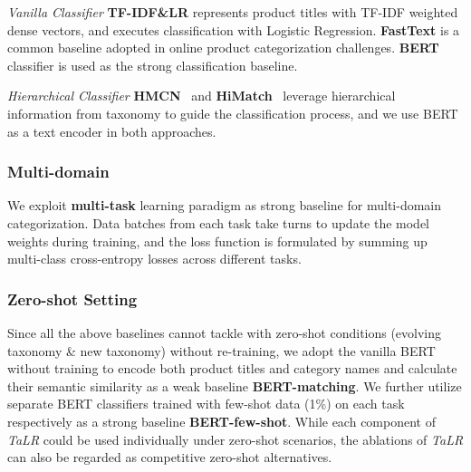 \textit{Vanilla Classifier} \textbf{TF-IDF\&LR} represents product titles with TF-IDF weighted dense vectors, and executes classification with Logistic Regression. \textbf{FastText} \cite{bojanowski2017enriching} is a common baseline adopted in online product categorization challenges. 
\textbf{BERT} classifier is used as the strong classification baseline.

\textit{Hierarchical Classifier} \textbf{HMCN}~\cite{wehrmann2018hierarchical} and \textbf{HiMatch}~\cite{chen2021hierarchy} leverage hierarchical information from taxonomy to 
guide the classification process, and we use BERT as a text encoder in both approaches. 

\subsubsection{Multi-domain}
We exploit \textbf{multi-task} learning paradigm as strong baseline for multi-domain categorization. 
Data batches from each task take turns to update the model weights during training, and the loss function is formulated by summing up multi-class cross-entropy losses across different tasks.
\subsubsection{Zero-shot Setting}
Since all the above baselines cannot tackle with zero-shot conditions (evolving taxonomy  \& new taxonomy) without re-training, we adopt the vanilla BERT without training to encode both product titles and category names and calculate their semantic similarity as a weak baseline \textbf{BERT-matching}. We further utilize separate BERT classifiers trained with few-shot data (1\%) on each task respectively as a strong baseline \textbf{BERT-few-shot}.
While each component of \textit{TaLR} could be used individually under zero-shot scenarios, the ablations of \textit{TaLR} can also be regarded as competitive zero-shot alternatives. 

